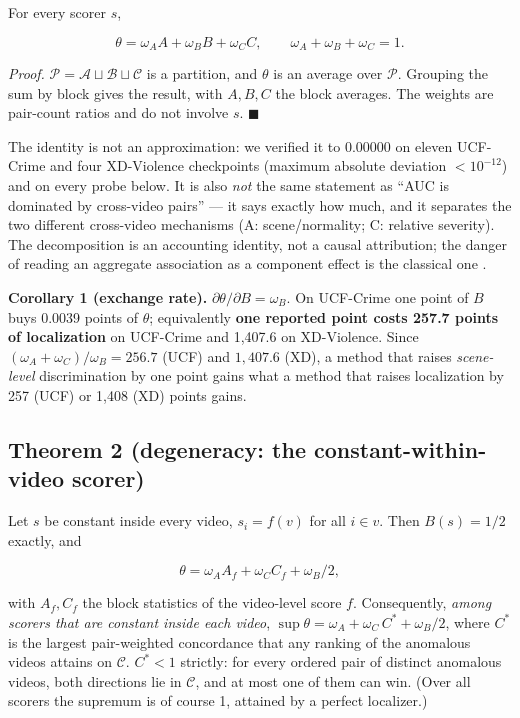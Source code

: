 \documentclass[number,preprint,12pt]{elsarticle}
\begin{document}
For every scorer \(s\),

\begin{equation}
\theta=\omega_A A+\omega_B B+\omega_C C,\qquad \omega_A+\omega_B+\omega_C=1 .
\label{eq:decomp}
\end{equation}

\emph{Proof.} \(\mathcal{P}=\mathcal{A}\sqcup\mathcal{B}\sqcup\mathcal{C}\) is a partition, and \(\theta\) is an average over \(\mathcal{P}\).
Grouping the sum by block gives the result, with \(A, B, C\) the block averages.
The weights are pair-count ratios and do not involve \(s\). \(\blacksquare\)

The identity is not an approximation: we verified it to 0.00000 on eleven UCF-Crime and four XD-Violence
checkpoints (maximum absolute deviation \(<10^{-12}\)) and on every
probe below. It is also \emph{not} the same statement as ``AUC is dominated by
cross-video pairs'' --- it says exactly how much, and it separates the two
different cross-video mechanisms (A: scene/normality; C: relative severity).
The decomposition is an accounting identity, not a causal attribution; the
danger of reading an aggregate association as a component effect is the
classical one \citep{simpson1951interpretation}.

\textbf{Corollary 1 (exchange rate).} \(\partial\theta/\partial B=\omega_B\). On UCF-Crime one point of \(B\)
buys 0.0039 points of \(\theta\); equivalently \textbf{one reported point costs 257.7 points of
localization} on UCF-Crime and 1,407.6 on XD-Violence. Since
\((\omega_A+\omega_C)/\omega_B=256.7\) (UCF) and \(1,407.6\) (XD), a method that raises
\emph{scene-level} discrimination by one point gains what a method that raises
localization by 257 (UCF) or 1,408 (XD) points gains.

\subsection{Theorem 2 (degeneracy: the constant-within-video scorer)}\label{sec:thm2}

Let \(s\) be constant inside every video, \(s_i=f(v)\) for all \(i\in v\). Then
\(B(s)=1/2\) exactly, and

\begin{equation}
\theta=\omega_A A_f+\omega_C C_f+\omega_B/2,
\end{equation}

with \(A_f,C_f\) the block statistics of the video-level score \(f\). Consequently,
\emph{among scorers that are constant inside each video},
\(\sup\theta=\omega_A+\omega_C\,C^{*}+\omega_B/2\), where \(C^{*}\) is the largest
pair-weighted concordance that any ranking of the anomalous videos attains on
\(\mathcal{C}\). \(C^{*}<1\) strictly: for every ordered pair of distinct anomalous
videos, both directions lie in \(\mathcal{C}\), and at most one of them can win.
(Over all scorers the supremum is of course 1, attained by a perfect localizer.)
\end{document}
